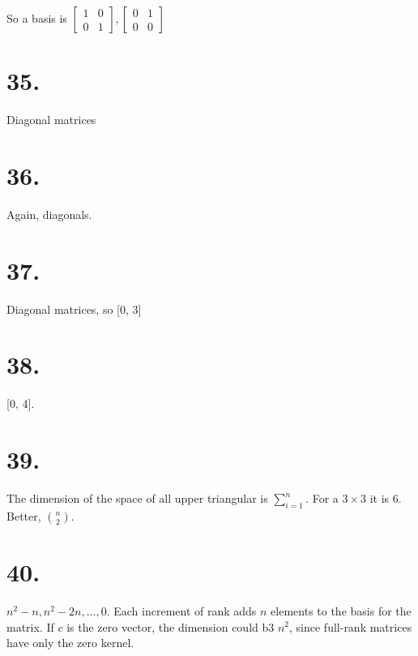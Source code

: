 \documentclass[]{article}
\begin{document}
So a basis is
\(\begin{bmatrix}1&0\\0&1\end{bmatrix},\begin{bmatrix}0&1\\0&0\end{bmatrix}\)

\hypertarget{section-31}{%
\section{35.}\label{section-31}}

Diagonal matrices

\hypertarget{section-32}{%
\section{36.}\label{section-32}}

Again, diagonals.

\hypertarget{section-33}{%
\section{37.}\label{section-33}}

Diagonal matrices, so {[}0, 3{]}

\hypertarget{section-34}{%
\section{38.}\label{section-34}}

{[}0, 4{]}.

\hypertarget{section-35}{%
\section{39.}\label{section-35}}

The dimension of the space of all upper triangular is \(\sum^n_{i=1}\).
For a \(3\times{3}\) it is 6. Better, \(n \choose 2\).

\hypertarget{section-36}{%
\section{40.}\label{section-36}}

\(n^2-n,n^2-2n,\dots,0\). Each increment of rank adds \(n\) elements to
the basis for the matrix. If \(c\) is the zero vector, the dimension
could b3 \(n^2\), since full-rank matrices have only the zero kernel.
\end{document}
